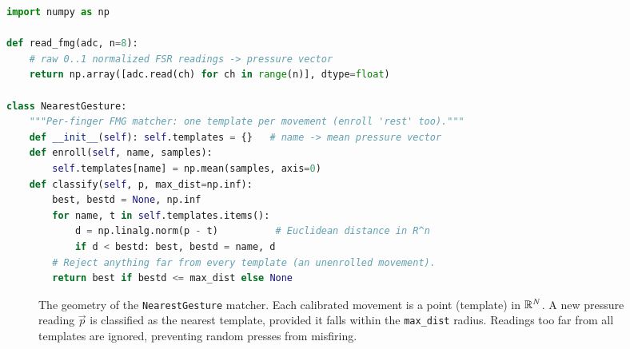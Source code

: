 \begin{lstlisting}[language=Python]
import numpy as np

def read_fmg(adc, n=8):
    # raw 0..1 normalized FSR readings -> pressure vector
    return np.array([adc.read(ch) for ch in range(n)], dtype=float)

class NearestGesture:
    """Per-finger FMG matcher: one template per movement (enroll 'rest' too)."""
    def __init__(self): self.templates = {}   # name -> mean pressure vector
    def enroll(self, name, samples):
        self.templates[name] = np.mean(samples, axis=0)
    def classify(self, p, max_dist=np.inf):
        best, bestd = None, np.inf
        for name, t in self.templates.items():
            d = np.linalg.norm(p - t)          # Euclidean distance in R^n
            if d < bestd: best, bestd = name, d
        # Reject anything far from every template (an unenrolled movement).
        return best if bestd <= max_dist else None
\end{lstlisting}

\begin{figure}[htbp]
\centering
{}
\caption{The geometry of the \texttt{NearestGesture} matcher. Each calibrated movement is a point (template) in $\mathbb{R}^{N}$. A new pressure reading $\vec{p}$ is classified as the nearest template, provided it falls within the \texttt{max\_dist} radius. Readings too far from all templates are ignored, preventing random presses from misfiring.}
\label{ch37:fig-nearest-matcher}
\end{figure}


